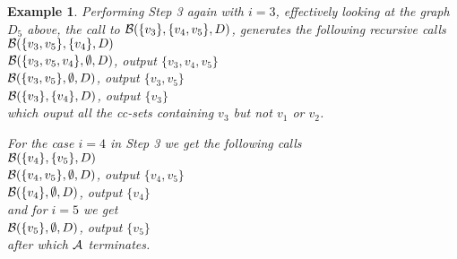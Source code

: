 \documentclass[11pt]{article}
\newcommand{\2}{\vspace{0.2 cm}}
\newtheorem{example}[theorem]{Example}
\begin{document}
\begin{example}
Performing Step 3 again with $i=3$, effectively looking at the graph
$D_5$ above, the call to ${\cal B}(\{v_3\},\{v_4,v_5\},D)$,
generates the following recursive calls\\
\mbox{\qquad} ${\cal B}(\{v_3,v_5\},\{v_4\},D)$\\
\mbox{\qquad\qquad} ${\cal B}(\{v_3,v_5,v_4\},\emptyset,D)$, output $\{v_3,v_4,v_5\}$\\
\mbox{\qquad\qquad} ${\cal B}(\{v_3,v_5\},\emptyset,D)$, output $\{v_3,v_5\}$\\
\mbox{\qquad} ${\cal B}(\{v_3\},\{v_4\},D)$, output $\{v_3\}$\\
which ouput all the cc-sets containing $v_3$ but not $v_1$ or $v_2$.


For the case $i=4$ in Step 3 we get the following calls\\
\mbox{\qquad} ${\cal B}(\{v_4\},\{v_5\},D)$\\
\mbox{\qquad\qquad} ${\cal B}(\{v_4,v_5\},\emptyset,D)$, output $\{v_4,v_5\}$\\
\mbox{\qquad\qquad} ${\cal B}(\{v_4\},\emptyset,D)$, output $\{v_4\}$\\
and for $i=5$ we get\\
\mbox{\qquad} ${\cal B}(\{v_5\},\emptyset,D)$, output $\{v_5\}$\\
after which $\cal A$ terminates.
\end{example}

\2
\end{document}
